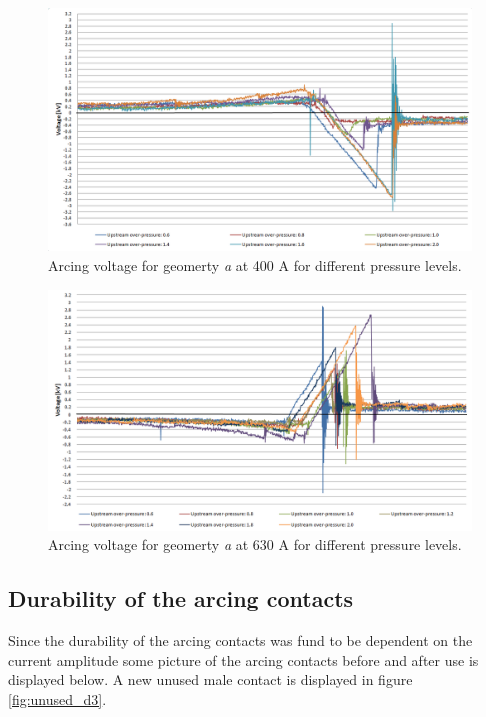 \documentclass[10pt,a4paper]{article}
\begin{document}
\begin{figure}[H]
\centering
\includegraphics[scale=0.5]{Bilder/Results/arcingVoltage400Ad4.png}
\caption{Arcing voltage for geomerty \textit{a} at 400 A for different pressure levels.} \label{fig:arcingVoltage400A}
\end{figure}

\begin{figure}[H]
\centering
\includegraphics[scale=0.5]{Bilder/Results/arcingVoltage630Ad4.png}
\caption{Arcing voltage for geomerty \textit{a} at 630 A for different pressure levels.} \label{fig:arcingVoltage630A}
\end{figure}


\newpage
\subsection{Durability of the arcing contacts} \label{sec:durability}

Since the durability of the arcing contacts was fund to be dependent on the current amplitude some picture of the arcing contacts before and after use is displayed below. A new unused male contact is displayed in figure \ref{fig:unused_d3}.
\end{document}

